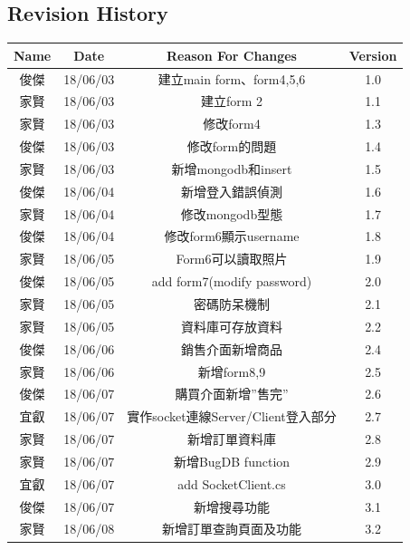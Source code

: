 \documentclass{scrreprt}
\begin{document}
\begin{CJK}{UTF8}{bkai}
\chapter*{Revision History}
\begin{center}
    \begin{longtable}{|c|c|c|c|}
        \hline
	    Name & Date & Reason For Changes & Version\\
        \hline
	    俊傑 & 18/06/03 & 建立main form、form4,5,6 & 1.0\\
        \hline
	    家賢 & 18/06/03 & 建立form 2 & 1.1\\
        \hline
	    家賢 & 18/06/03 & 修改form4 & 1.3\\
        \hline
	    俊傑 & 18/06/03 & 修改form的問題 & 1.4\\
        \hline
	    家賢 & 18/06/03 & 新增mongodb和insert & 1.5\\
        \hline
	    俊傑 & 18/06/04 & 新增登入錯誤偵測 & 1.6\\
        \hline
	    家賢 & 18/06/04 & 修改mongodb型態 & 1.7\\
        \hline
	    俊傑 & 18/06/04 & 修改form6顯示username & 1.8\\
        \hline
	    家賢 & 18/06/05 & Form6可以讀取照片 & 1.9\\
        \hline
	    俊傑 & 18/06/05 & add form7(modify password) & 2.0\\
        \hline
	    家賢 & 18/06/05 & 密碼防呆機制 & 2.1\\
        \hline
	    家賢 & 18/06/05 & 資料庫可存放資料 & 2.2\\
        \hline
	    俊傑 & 18/06/06 & 銷售介面新增商品 & 2.4\\
        \hline
	    家賢 & 18/06/06 & 新增form8,9 & 2.5\\
        \hline
	    俊傑 & 18/06/07 & 購買介面新增”售完” & 2.6\\
        \hline
	    宜叡 & 18/06/07 & 實作socket連線Server/Client登入部分 & 2.7\\
        \hline
	    家賢 & 18/06/07 & 新增訂單資料庫 & 2.8\\
        \hline
	    家賢 & 18/06/07 & 新增BugDB function & 2.9\\
        \hline
	    宜叡 & 18/06/07 & add SocketClient.cs & 3.0\\
        \hline
	    俊傑 & 18/06/07 & 新增搜尋功能 & 3.1\\
        \hline
	    家賢 & 18/06/08 & 新增訂單查詢頁面及功能 & 3.2\\

\end{longtable}
\end{center}
\end{CJK}
\end{document}
